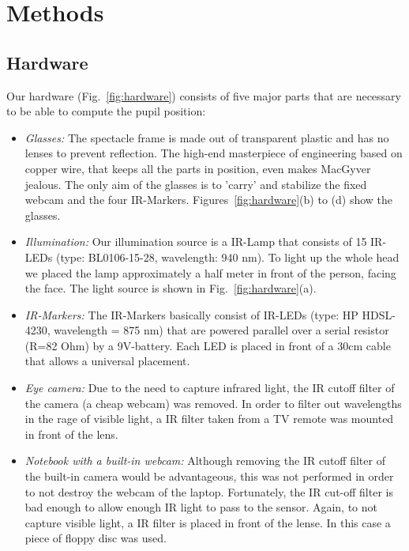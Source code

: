 \section{Methods}\label{methods}

\subsection{Hardware}

Our hardware (Fig.~\ref{fig:hardware}) consists of five major parts that are necessary to be able to compute the pupil position:

\begin{itemize}
  \item \textit{Glasses:} 
  The spectacle frame is made out of transparent plastic and has no lenses to prevent reflection. 
  The high-end masterpiece of engineering based on copper wire, that keeps all the parts in position, even makes MacGyver jealous.
  The only aim of the glasses is to 'carry' and stabilize the fixed webcam and the four IR-Markers. Figures~\ref{fig:hardware}(b) to (d) show the glasses.

\item \textit{Illumination:}
  Our illumination source is a IR-Lamp that consists of 15 IR-LEDs (type: BL0106-15-28, wavelength: 940 nm). To light up the whole head we placed the lamp approximately a half meter in front of the person, facing the face. The light source is shown in Fig.~\ref{fig:hardware}(a).

  \item \textit{IR-Markers:} 
The IR-Markers basically consist of IR-LEDs (type: HP HDSL-4230, wavelength = 875 nm) that are powered parallel over a serial resistor (R=82 Ohm) by a 9V-battery. Each LED is placed in front of a 30cm cable that allows a universal placement. 

  \item \textit{Eye camera:} Due to the need to capture infrared light, the IR cutoff filter of the camera (a cheap webcam) was removed. In order to filter out wavelengths in the rage of visible light, a IR filter taken from a TV remote was mounted in front of the lens.

  \item \textit{Notebook with a built-in webcam:} Although removing the IR cutoff filter of the built-in camera would be advantageous, this was not performed in order to not destroy the webcam of the laptop. 
    Fortunately, the IR cut-off filter is bad enough to allow enough IR light to pass to the sensor. 
    Again, to not capture visible light, a IR filter is placed in front of the lense. In this case a piece of floppy disc was used.


\end{itemize}

